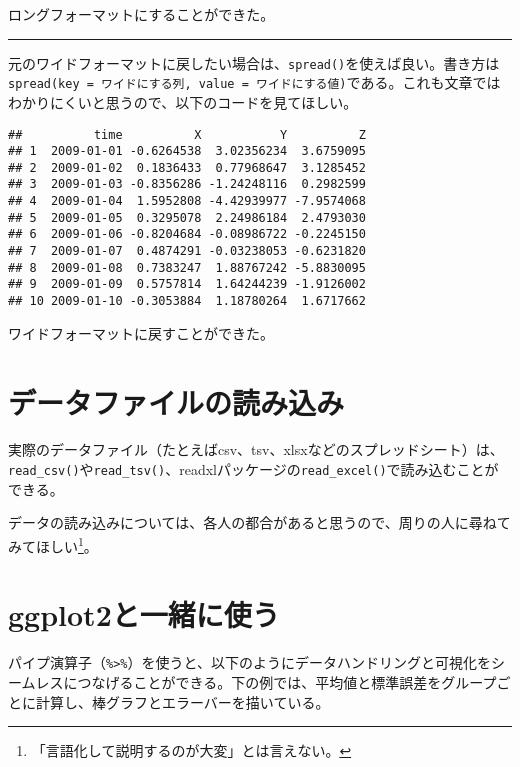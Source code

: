 \documentclass[]{book}
\newenvironment{Shaded}{\begin{snugshade}}{\end{snugshade}}
\newcommand{\KeywordTok}[1]{\textcolor[rgb]{0.13,0.29,0.53}{\textbf{#1}}}
\newcommand{\StringTok}[1]{\textcolor[rgb]{0.31,0.60,0.02}{#1}}
\newcommand{\OperatorTok}[1]{\textcolor[rgb]{0.81,0.36,0.00}{\textbf{#1}}}
\newcommand{\NormalTok}[1]{#1}
\let\rmarkdownfootnote\footnote%
\def\footnote{\protect\rmarkdownfootnote}
\begin{document}
ロングフォーマットにすることができた。

\begin{center}\rule{0.5\linewidth}{\linethickness}\end{center}

元のワイドフォーマットに戻したい場合は、\texttt{spread()}を使えば良い。書き方は\texttt{spread(key\ =\ ワイドにする列,\ value\ =\ ワイドにする値)}である。これも文章ではわかりにくいと思うので、以下のコードを見てほしい。

\begin{Shaded}
\end{Shaded}

\begin{verbatim}
##          time          X           Y          Z
## 1  2009-01-01 -0.6264538  3.02356234  3.6759095
## 2  2009-01-02  0.1836433  0.77968647  3.1285452
## 3  2009-01-03 -0.8356286 -1.24248116  0.2982599
## 4  2009-01-04  1.5952808 -4.42939977 -7.9574068
## 5  2009-01-05  0.3295078  2.24986184  2.4793030
## 6  2009-01-06 -0.8204684 -0.08986722 -0.2245150
## 7  2009-01-07  0.4874291 -0.03238053 -0.6231820
## 8  2009-01-08  0.7383247  1.88767242 -5.8830095
## 9  2009-01-09  0.5757814  1.64244239 -1.9126002
## 10 2009-01-10 -0.3053884  1.18780264  1.6717662
\end{verbatim}

ワイドフォーマットに戻すことができた。

\section{データファイルの読み込み}

実際のデータファイル（たとえばcsv、tsv、xlsxなどのスプレッドシート）は、\texttt{read\_csv()}や\texttt{read\_tsv()}、readxlパッケージの\texttt{read\_excel()}で読み込むことができる。

データの読み込みについては、各人の都合があると思うので、周りの人に尋ねてみてほしい\footnote{「言語化して説明するのが大変」とは言えない。}。

\section{ggplot2と一緒に使う}\label{ggplot2}

パイプ演算子（\texttt{\%\textgreater{}\%}）を使うと、以下のようにデータハンドリングと可視化をシームレスにつなげることができる。下の例では、平均値と標準誤差をグループごとに計算し、棒グラフとエラーバーを描いている。
\end{document}
